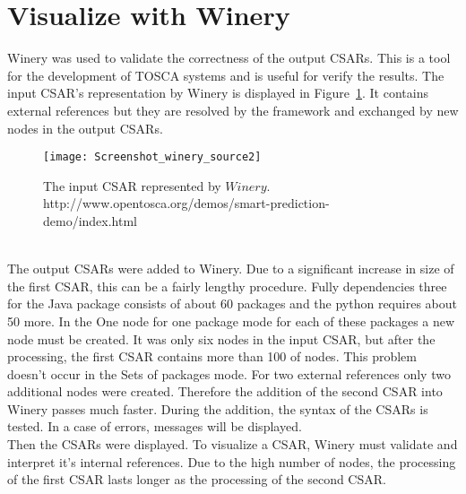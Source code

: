 \section{Visualize with Winery}\label{sec:checkwin}
Winery was used to validate the correctness of the output CSARs. 
 This is a tool for the development of TOSCA systems and is useful for verify the results. %
 The input CSAR's representation by Winery is displayed in Figure~\ref{fig:winery_source2}.
 It contains external references but they are resolved by the framework and exchanged by new nodes in the output CSARs. 
 \begin{figure}[ht]   
 	\centering
 	\texttt{[image: Screenshot\_winery\_source2]}
 	\caption{The input CSAR represented by $Winery$.\\\small http://www.opentosca.org/demos/smart-prediction-demo/index.html}
 	\label{fig:winery_source2}
 \end{figure}
   \\
 The output CSARs were added to Winery.
 Due to a significant increase in size of the first CSAR, this can be a fairly lengthy procedure.
Fully dependencies three for the Java package consists of about 60 packages and the python requires about 50 more. 
In the One node for one package mode for each of these packages a new node must be created.
It was only six nodes in the input CSAR, but after the processing, the first CSAR contains more than 100 of nodes.
This problem doesn't occur in the Sets of packages mode. 
For two external references only two additional nodes were created.
Therefore the addition of the second CSAR into Winery passes much faster. 
 During the addition, the syntax of the CSARs is tested.
 In a case of errors, messages will be displayed.
 \\
Then the CSARs were displayed.
To visualize a CSAR, Winery must validate and interpret it's internal references.
Due to the high number of nodes, the processing of the first CSAR lasts longer as the processing of the second CSAR. 
